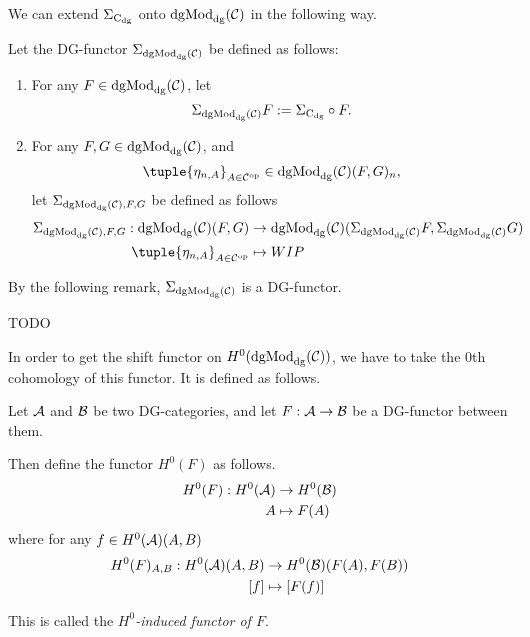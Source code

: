 We can extend \( \Sigma_{\operatorname{C}_{\operatorname{dg}}} \) onto \( \operatorname{dgMod}_{\operatorname{dg}}({\mathcal{C}}) \) in the following way.

\begin{definition}
    \label{def:sigma_dgmod}
    Let the DG-functor \( \Sigma_{\operatorname{dgMod}_{\operatorname{dg}}({\mathcal{C}})} \) be defined as follows:
    \begin{enumerate}
        \item {
            For any \( F \in \operatorname{dgMod}_{\operatorname{dg}}({\mathcal{C}}) \), let
            \[
                \Sigma_{\operatorname{dgMod}_{\operatorname{dg}}({\mathcal{C}})} F := \Sigma_{\operatorname{C}_{\operatorname{dg}}} \circ F.
            \]
        }
        \item {
            For any \( F, G \in \operatorname{dgMod}_{\operatorname{dg}}({\mathcal{C}}) \), and
            \[
                \tuple{\eta_{n, A}}_{A \in \Cc^{\op}} \in \dgMod_{\dg}(\Cc)(F, G)_n,
            \]
            let \( \Sigma_{\operatorname{dgMod}_{\operatorname{dg}}({\mathcal{C}}), F, G} \) be defined as follows
            \begin{align*}
                \Sigma_{\dgMod_{\dg}(\Cc), F, G}: \dgMod_{\dg}(\Cc)(F, G) &\to \dgMod_{\dg}(\Cc)(\Sigma_{\dgMod_{\dg}(\Cc)} F, \Sigma_{\dgMod_{\dg}(\Cc)} G) \\
                \tuple{\eta_{n, A}}_{A \in \Cc^{\op}} &\mapsto WIP
            \end{align*}
        }
    \end{enumerate}
\end{definition}

By the following remark, \( \Sigma_{\operatorname{dgMod}_{\operatorname{dg}}({\mathcal{C}})} \) is a DG-functor.

\begin{remark}
    TODO
\end{remark}

In order to get the shift functor on \( H^0(\operatorname{dgMod}_{\operatorname{dg}}({\mathcal{C}})) \), we have to take the \( 0 \)th cohomology of this functor. It is defined as follows.

\begin{definition}
    \label{def:H^0-induced_functor}
    Let \( {\mathcal{A}} \) and \( {\mathcal{B}} \) be two DG-categories, and let \( F: {\mathcal{A}} \to {\mathcal{B}} \) be a DG-functor between them.

    Then define the functor \( H^0(F) \) as follows.
    \begin{align*}
        H^0(F): H^0({\mathcal{A}}) &\to H^0({\mathcal{B}}) \\
        A &\mapsto F(A)
    \end{align*}
    where for any \( f \in H^0({\mathcal{A}})(A, B) \)
    \begin{align*}
        H^0(F)_{A, B}: H^0({\mathcal{A}})(A, B) &\to H^0({\mathcal{B}})(F(A), F(B)) \\
        [f] &\mapsto [F(f)]
    \end{align*}

    This is called the \emph{\( H^0 \)-induced functor of \( F \)}.
\end{definition}

